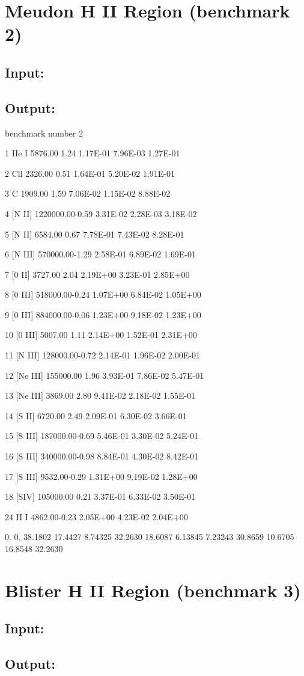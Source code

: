 \section{Meudon H II Region (benchmark 2)}

\subsection{ Input:}


\subsection{Output:}

benchmark number   2

    1 He I       5876.00 1.24   1.17E-01  7.96E-03  1.27E-01

    2 Cll        2326.00 0.51   1.64E-01  5.20E-02  1.91E-01

    3 C          1909.00 1.59   7.06E-02  1.15E-02  8.88E-02

    4 [N II]  1220000.00-0.59   3.31E-02  2.28E-03  3.18E-02

    5 [N II]     6584.00 0.67   7.78E-01  7.43E-02  8.28E-01

    6 [N III]  570000.00-1.29   2.58E-01  6.89E-02  1.69E-01

    7 [0 II]     3727.00 2.04   2.19E+00  3.23E-01  2.85E+00

    8 [0 III]  518000.00-0.24   1.07E+00  6.84E-02  1.05E+00

    9 [0 III]  884000.00-0.06   1.23E+00  9.18E-02  1.23E+00

   10 [0 III]    5007.00 1.11   2.14E+00  1.52E-01  2.31E+00

   11 [N III]  128000.00-0.72   2.14E-01  1.96E-02  2.00E-01

   12 [Ne III] 155000.00 1.96   3.93E-01  7.86E-02  5.47E-01

   13 [Ne III]   3869.00 2.80   9.41E-02  2.18E-02  1.55E-01

   14 [S II]     6720.00 2.49   2.09E-01  6.30E-02  3.66E-01

   15 [S III]  187000.00-0.69   5.46E-01  3.30E-02  5.24E-01

   16 [S III]  340000.00-0.98   8.84E-01  4.30E-02  8.42E-01

   17 [S III]    9532.00-0.29   1.31E+00  9.19E-02  1.28E+00

   18 [SIV]    105000.00 0.21   3.37E-01  6.33E-02  3.50E-01

   24 H I        4862.00-0.23   2.05E+00  4.23E-02  2.04E+00

  0.  0.    38.1802    17.4427    8.74325    32.2630    18.6087    6.13845
    7.23243    30.8659    10.6705    16.8548    32.2630


\section{Blister H II Region (benchmark 3)}

\subsection{ Input:}


\subsection{Output:}



